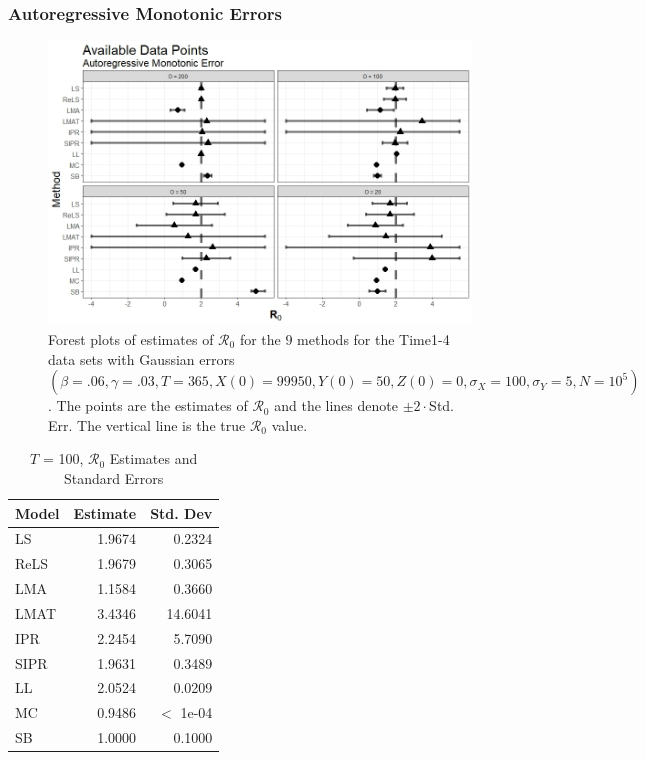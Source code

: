 \documentclass[12pt]{article}
\newcommand{\xxsir}{\ensuremath{9} } %
\newcommand{\rr}{\ensuremath{\mathcal{R}_0}}
\begin{document}
\subsubsection{Autoregressive Monotonic Errors}
\begin{figure}[H]
	\centering
	\includegraphics[scale=0.5]{images/time_arm.jpeg}
	\caption{Forest plots of estimates of $\rr$ for the \xxsir methods for the Time1-4 data sets with Gaussian errors $(\beta=.06, \gamma=.03, T=365, X(0)=99950, Y(0)=50, Z(0)=0, \sigma_X=100, \sigma_Y=5, N=10^5)$.  The points are the estimates of $\rr$ and the lines denote $\pm 2\cdot $Std. Err.  The vertical line is the true $\rr$ value.}
\end{figure}

\begin{table}[H]
	
	
	\centering
	\begin{tabular}[t]{l|r|r}
		\hline
		Model & Estimate & Std. Dev\\
		\hline
		LS & 1.9674 & 0.2324\\
		\hline
		ReLS & 1.9679 & 0.3065\\
		\hline
		LMA & 1.1584 & 0.3660\\
		\hline
		LMAT & 3.4346 & 14.6041\\
		\hline
		IPR & 2.2454 & 5.7090\\
		\hline
		SIPR & 1.9631 & 0.3489\\
		\hline
		LL & 2.0524 & 0.0209\\
		\hline
		MC & 0.9486 & $<$ 1e-04\\
		\hline
		SB & 1.0000 & 0.1000\\
		\hline
	\end{tabular}
	\caption{ $T$ = 100, $\rr$ Estimates and Standard Errors}
\end{table}
\end{document}
